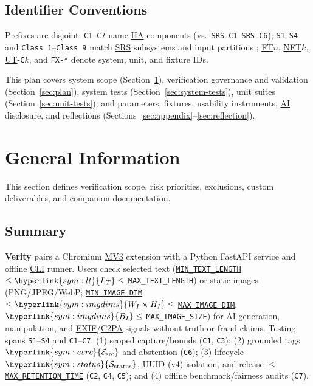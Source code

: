 \documentclass[12pt, titlepage]{article}
\newcommand{\MinTextLength}{\hyperref[const:MIN_TEXT_LENGTH]{\texttt{MIN\_\allowbreak{}TEXT\_\allowbreak{}LENGTH}}}
\newcommand{\MaxTextLength}{\hyperref[const:MAX_TEXT_LENGTH]{\texttt{MAX\_\allowbreak{}TEXT\_\allowbreak{}LENGTH}}}
\newcommand{\MaxImageSize}{\hyperref[const:MAX_IMAGE_SIZE]{\texttt{MAX\_\allowbreak{}IMAGE\_\allowbreak{}SIZE}}}
\newcommand{\MinImageDim}{\hyperref[const:MIN_IMAGE_DIM]{\texttt{MIN\_\allowbreak{}IMAGE\_\allowbreak{}DIM}}}
\newcommand{\MaxImageDim}{\hyperref[const:MAX_IMAGE_DIM]{\texttt{MAX\_\allowbreak{}IMAGE\_\allowbreak{}DIM}}}
\newcommand{\MaxRetentionTime}{\hyperref[const:MAX_RETENTION_TIME]{\texttt{MAX\_\allowbreak{}RETENTION\_\allowbreak{}TIME}}}
\newcommand{\SymStatus}{\hyperlink{sym:status}{\mathcal{S}_{\text{status}}}}
\newcommand{\SymEsrc}{\hyperlink{sym:esrc}{\mathcal{E}_{\text{src}}}}
\newcommand{\SymLT}{\hyperlink{sym:lt}{L_T}}
\newcommand{\SymImgDims}{\hyperlink{sym:imgdims}{W_I \times H_I}}
\newcommand{\SymImgBytes}{\hyperlink{sym:imgdims}{B_I}}
\newcommand{\AI}{\hyperlink{vnv-acr-ai}{AI}}
\newcommand{\CLI}{\hyperlink{vnv-acr-cli}{CLI}}
\newcommand{\CTwoPA}{\hyperlink{vnv-acr-c2pa}{C2PA}}
\newcommand{\EXIF}{\hyperlink{vnv-acr-exif}{EXIF}}
\newcommand{\FT}{\hyperlink{vnv-acr-ft}{FT}}
\newcommand{\HA}{\hyperlink{vnv-acr-ha}{HA}}
\newcommand{\MVThree}{\hyperlink{vnv-acr-mv3}{MV3}}
\newcommand{\NFT}{\hyperlink{vnv-acr-nft}{NFT}}
\newcommand{\SRS}{\hyperlink{vnv-acr-srs}{SRS}}
\newcommand{\UT}{\hyperlink{vnv-acr-ut}{UT}}
\newcommand{\UUID}{\hyperlink{vnv-acr-uuid}{UUID}}
\begin{document}
\subsection{Identifier Conventions}\label{subsec:id-conventions}

Prefixes are disjoint: \texttt{C1}--\texttt{C7} name \HA{} components \cite{VerityHA2026} (vs.\ \texttt{SRS-C1}--\texttt{SRS-C6}); \texttt{S1}--\texttt{S4} and \texttt{Class 1}--\texttt{Class 9} match \SRS{} subsystems and input partitions \cite{VeritySRS2026}; \FT{}$n$, \NFT{}$k$, \UT{}-\texttt{C}$k$, and \texttt{FX-*} denote system, unit, and fixture IDs.

\newpage
{}

\noindent This plan covers system scope (Section~\ref{sec:general-info}), verification governance and validation (Section~\ref{sec:plan}), system tests (Section~\ref{sec:system-tests}), unit suites (Section~\ref{sec:unit-tests}), and parameters, fixtures, usability instruments, \AI{} disclosure, and reflections (Sections~\ref{sec:appendix}--\ref{sec:reflection}).

\section{General Information}\label{sec:general-info}

This section defines verification scope, risk priorities, exclusions, custom deliverables, and companion documentation.

\subsection{Summary}\label{subsec:summary}

\textbf{Verity} pairs a Chromium \MVThree{} extension with a Python FastAPI service and offline \CLI{} runner. Users check selected text (\MinTextLength{} $\le \SymLT \le$ \MaxTextLength{}) or static images (PNG/JPEG/WebP; \MinImageDim{} $\le \SymImgDims \le$ \MaxImageDim{}, $\SymImgBytes \le$ \MaxImageSize{}) for \AI{}-generation, manipulation, and \EXIF{}/\CTwoPA{} signals without truth or fraud claims. Testing spans \texttt{S1}--\texttt{S4} and \texttt{C1}--\texttt{C7}: (1) scoped capture/bounds (\texttt{C1}, \texttt{C3}); (2) grounded tags $\SymEsrc$ and abstention (\texttt{C6}); (3) lifecycle $\SymStatus$, \UUID{} (v4) isolation, and release $\le$ \MaxRetentionTime{} (\texttt{C2}, \texttt{C4}, \texttt{C5}); and (4) offline benchmark/fairness audits (\texttt{C7}).
\end{document}
